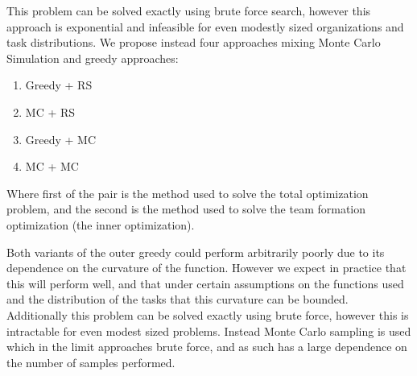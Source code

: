 This problem can be solved exactly using brute force search, however this approach is exponential and infeasible for even modestly sized organizations and task distributions. We propose instead four approaches mixing Monte Carlo Simulation and greedy approaches: 

\begin{enumerate}
	\item Greedy + RS
	\item MC + RS
	\item Greedy + MC
	\item MC + MC
\end{enumerate}

Where first of the pair is the method used to solve the total optimization problem, and the second is the method used to solve the team formation optimization (the inner optimization).



Both variants of the outer greedy could perform arbitrarily poorly due to its dependence on the curvature of the function. However we expect in practice that this will perform well, and that under certain assumptions on the functions used and the distribution of the tasks that this curvature can be bounded. Additionally this problem can be solved exactly using brute force, however this is intractable for even modest sized problems. Instead Monte Carlo sampling is used which in the limit approaches brute force, and as such has a large dependence on the number of samples performed.  


